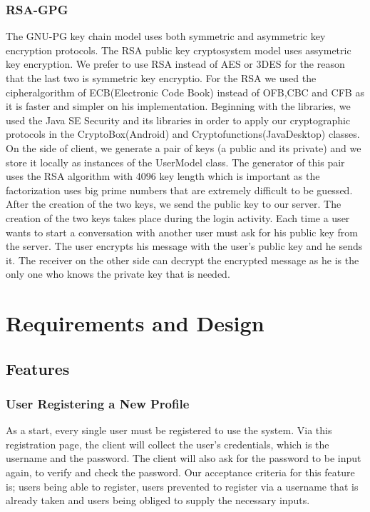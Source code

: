 \documentclass[11pt,a4paper]{report}
\begin{document}
\subsection{RSA-GPG}
The GNU-PG key chain model uses both symmetric and asymmetric key encryption protocols. The RSA public key cryptosystem model uses assymetric key encryption. We prefer to use RSA instead of AES or 3DES for the reason that the last two is symmetric key encryptio. For the RSA we used the cipheralgorithm of ECB(Electronic Code Book) instead of OFB,CBC and CFB as it is faster and simpler on his implementation. Beginning with the libraries, we used the Java SE Security and its libraries in order to apply our cryptographic protocols in the CryptoBox(Android) and Cryptofunctions(JavaDesktop) classes. On the side of client, we generate a pair of keys (a public and its private) and we store it locally as instances of the UserModel class. The generator of this pair uses the RSA algorithm with 4096 key length which is important as the factorization uses big prime numbers that are extremely difficult to be guessed. After the creation of the two keys, we send the public key to our server. The creation of the two keys takes place during the login activity. Each time a user wants to start a conversation with another user must ask for his public key from the server. The user encrypts his message with the user’s public key and he sends it. The receiver on the other side can decrypt the encrypted message as he is the only one who knows the private key that is needed.

\chapter{Requirements and Design}

\section{Features}
\subsection{User Registering a New Profile}
As a start, every single user must be registered to use the system. Via this registration page, the client will collect the user’s credentials, which is the username and the password. The client will also ask for the password to be input again, to verify and check the password. Our acceptance criteria for this feature is; users being able to register, users prevented to register via a username that is already taken and users being obliged to supply the necessary inputs.
\end{document}
